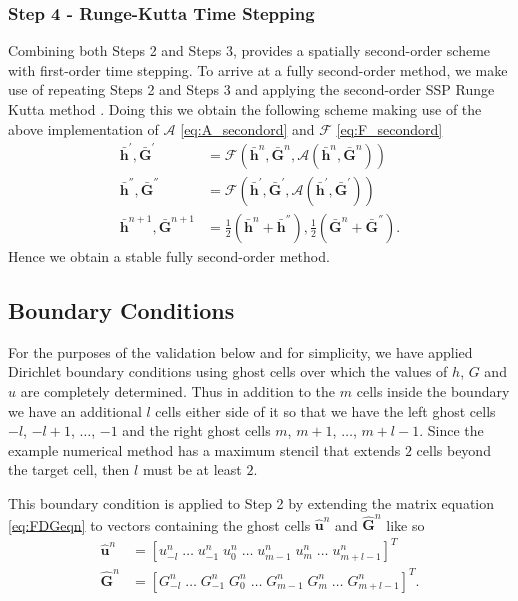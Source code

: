 \documentclass[10pt]{elsarticle}
\newcommand{\vecn}[1]{\boldsymbol{#1}}
\begin{document}
\subsubsection{Step 4 - Runge-Kutta Time Stepping}
Combining both Steps 2 and Steps 3, provides a spatially second-order scheme with first-order time stepping. To arrive at a fully second-order method, we make use of repeating Steps 2 and Steps 3 and applying the second-order SSP Runge Kutta method \cite{Gottlieb-etal-2003-89}. Doing this we obtain the following scheme making use of the above implementation of $\mathcal{A}$ \eqref{eq:A_secondord} and $\mathcal{F}$ \eqref{eq:F_secondord}
\begin{align*}
\bar{\vecn{h}}^{'},\bar{\vecn{G}}^{'} &= \mathcal{F}\left(\bar{\vecn{h}}^n,\bar{\vecn{G}}^n,\mathcal{A}\left(\bar{\vecn{h}}^n,\bar{\vecn{G}}^n\right) \right) \\
\bar{\vecn{h}}^{''},\bar{\vecn{G}}^{''} &= \mathcal{F}\left(\bar{\vecn{h}}^{'},\bar{\vecn{G}}^{'},\mathcal{A}\left(\bar{\vecn{h}}^{'},\bar{\vecn{G}}^{'}\right) \right)\\
\bar{\vecn{h}}^{n+1},\bar{\vecn{G}}^{n+1} &= \frac{1}{2}\left(\bar{\vecn{h}}^n + \bar{\vecn{h}}^{''} \right) ,  \frac{1}{2}\left(\bar{\vecn{G}}^n + \bar{\vecn{G}}^{''} \right). 
\end{align*}
Hence we obtain a stable fully second-order method. 

\subsection{Boundary Conditions}
For the purposes of the validation below and for simplicity, we have applied Dirichlet boundary conditions using ghost cells over which the values of $h$, $G$ and $u$ are completely determined. Thus in addition to the $m$ cells inside the boundary we have an additional $l$ cells either side of it so that we have the left ghost cells $-l$, $-l + 1$, $\dots$, $-1$ and the right ghost cells $m$, $m+1$, $\dots$, $m + l -1$. Since the example numerical method has a maximum stencil that extends $2$ cells beyond the target cell, then $l$ must be at least $2$. 

This boundary condition is applied to Step 2 by extending the matrix equation \eqref{eq:FDGeqn} to vectors containing the ghost cells $\vecn{\hat{u}}^n$ and $\vecn{\hat{G}}^n$ like so
\begin{align}
\vecn{\hat{u}}^n &= \left[u^n_{-l} \; \dots \; u^n_{-1} \; u^n_{0}\; \dots \; u^n_{m-1}\; u^n_{m} \; \dots \; u^n_{m + l -1}   \right]^T \\
\vecn{\hat{G}}^n &= \left[G^n_{-l} \; \dots \; G^n_{-1} \; G^n_{0}\; \dots \; G^n_{m-1}\; G^n_{m} \; \dots \; G^n_{m + l -1}   \right]^T.
\end{align}
\end{document}
